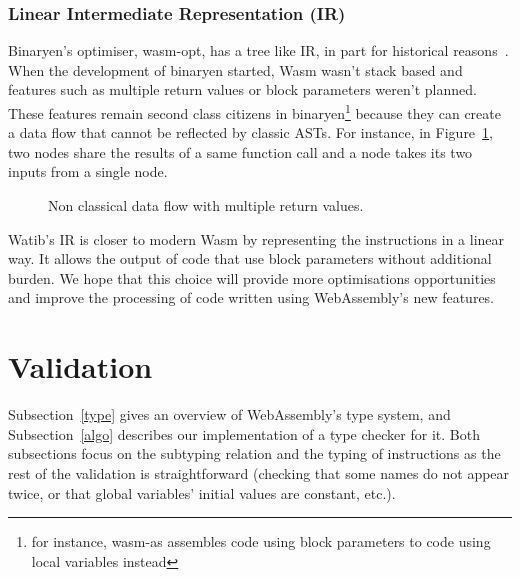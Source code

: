\documentclass[a4paper,11pt]{article}
\begin{document}
\subsubsection{Linear Intermediate Representation (IR)}
Binaryen's optimiser, \textsf{wasm-opt}, has a tree like IR, in part for
historical reasons~\cite{BinaryenIR}. When the development of binaryen started,
Wasm wasn't stack based and features such as multiple return values or block
parameters weren't planned. These features remain second class citizens in
binaryen\footnote{for instance, \textsf{wasm-as} assembles code using block
parameters to code using local variables instead} because they can create a data
flow that cannot be reflected by classic ASTs. For instance, in
Figure~\ref{data-flow}, two nodes share the results of a same function call and
a node takes its two inputs from a single node.

\begin{figure}[h]
  \centering
  \caption{Non classical data flow with multiple return values.}\label{data-flow}
\end{figure}

\textsf{Watib}'s IR is closer to modern Wasm by representing the instructions in
a linear way. It allows the output of code that use block parameters without
additional burden. We hope that this choice will provide more optimisations
opportunities and improve the processing of code written using WebAssembly's new
features.

\section{Validation}\label{val}
Subsection~\ref{type} gives an overview of WebAssembly's type system, and
Subsection~\ref{algo} describes our implementation of a type checker for it.
Both subsections focus on the subtyping relation and the typing of instructions
as the rest of the validation is straightforward (checking that some names do not
appear twice, or that global variables' initial values are constant, etc.).
\end{document}
